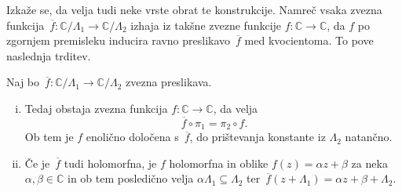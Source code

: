 \documentclass[mat1]{fmfdelo}
\numberwithin{equation}{section}
\newcommand{\C}{\mathbb C}
\newcommand{\inv}{^{-1}}
\newcommand{\torus}{\C/\Lambda}
\newcommand{\olsi}[1]{\,\overline{\!{#1}}} %
\newcommand{\tj}{tj.\ }
\theoremstyle{definition}
\begin{document}




Izkaže se, da velja tudi neke vrste obrat te konstrukcije. Namreč vsaka zvezna funkcija $\olsi{f}: \C/\Lambda_1 \to \C/\Lambda_2$ izhaja iz takšne zvezne funkcije $f:\C \to \C$, da $f$ po zgornjem premisleku inducira ravno preslikavo $\olsi{f}$ med kvocientoma. To pove naslednja trditev.



\begin{trditev}
    \label{oblika holomorfnih preslikav med torusi}
    Naj bo $\olsi{f} : \C/\Lambda_1 \to \C/\Lambda_2$ zvezna preslikava.
    \begin{enumerate}[(i)]
        \item 
    Tedaj obstaja zvezna funkcija $f: \C \to \C$, da velja 
    \[
        \olsi{f} \circ \pi_1 = \pi_2 \circ f.
    \]
    Ob tem je $f$ enolično določena s $\olsi{f}$, do prištevanja konstante iz $\Lambda_2$ natančno. 
        \item
    Če je $\olsi{f}$ tudi holomorfna, je $f$ holomorfna in oblike $f(z) = \alpha z + \beta$ za neka $\alpha, \beta \in \C$ in ob tem posledično velja $\alpha\Lambda_1 \subseteq \Lambda_2$ ter $\olsi{f}(z + \Lambda_1) = \alpha z + \beta + \Lambda_2$.   
    \end{enumerate}
\end{trditev}
\end{document}
